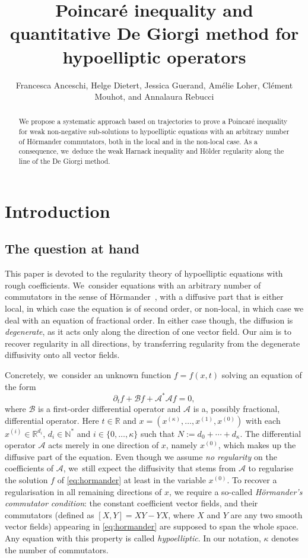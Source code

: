 \documentclass[10pt]{amsart}
\title{Poincaré inequality and quantitative De Giorgi method for hypoelliptic operators}
\author[Anceschi et al.]{Francesca Anceschi, Helge Dietert, Jessica Guerand, Amélie Loher, Clément Mouhot, and Annalaura Rebucci}
\theoremstyle{definition}
\newcommand\N{{\mathbb N}}
\newcommand\R{{\mathbb R}}
\newcommand{\cA}{{\mathcal A}}
\newcommand{\cB}{{\mathcal B}}
\begin{document}
\begin{abstract}
We propose a systematic approach based on trajectories to prove a Poincaré inequality for weak non-negative sub-solutions to hypoelliptic equations with an arbitrary number of Hörmander commutators, both in the local and in the non-local case. As a consequence, we~deduce the weak Harnack inequality and Hölder regularity along the line of the De Giorgi method.
\end{abstract}
\maketitle
\section{Introduction}
\label{sec:intro}

\subsection{The question at hand}

This paper is devoted to the regularity theory of hypoelliptic
equations with rough coefficients. We~consider equations with an
arbitrary number of commutators in the sense of Hörmander~\cite{MR0222474},
with a diffusive part that is either local, in which case the equation is of second order,
or non-local, in which case we deal with an equation of fractional order. In either case though,
the diffusion is \textit{degenerate}, as it acts only along the direction of one vector field.
Our aim is to recover regularity in all directions, by transferring regularity from the degenerate diffusivity onto
all vector fields.

Concretely, we~consider an unknown function $f=f(x,t)$ solving an equation of the form
\begin{equation}
\label{eq:hormander}
\partial_t f + \cB f + \cA^* \cA f =0,
\end{equation}
where $\cB$ is a first-order differential operator and
$\cA$ is a, possibly fractional, differential operator.
Here $t \in \R$ and $x=(x^{(\kappa)},\dots,x^{(1)},x^{(0)})$
with each
$x^{(i)} \in \R^{d_i}$, $d_i \in \N^*$ and
$i \in \{0,\dots,\kappa\}$ such that
$N:=d_0+\cdots+d_\kappa$. The differential operator $\cA$ acts merely in one direction of $x$, namely $x^{(0)}$,
which makes up the diffusive part of the equation.
Even though we assume \textit{no regularity} on the coefficients of $\cA$, we~still expect the diffusivity that stems from $\cA$ to regularise the
solution $f$ of \eqref{eq:hormander} at least in the variable $x^{(0)}$. To recover a regularisation in all remaining directions of $x$,
we require a so-called \textit{Hörmander's commutator condition}: the constant coefficient vector fields, and their commutators
(defined as $[X, Y] = XY - YX$, where $X$ and $Y$ are any two smooth vector fields) appearing in \eqref{eq:hormander} are supposed
to span the whole space. Any equation with this property is called \textit{hypoelliptic}. In our notation, $\kappa$ denotes the number of commutators.
\end{document}
